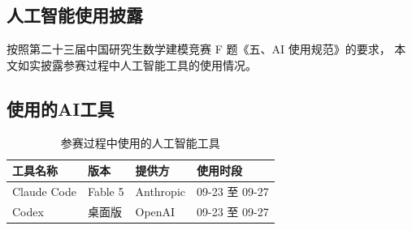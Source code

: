 \documentclass[bwprint]{gmcmthesis}
\numberwithin{equation}{section}
\numberwithin{figure}{section}
\numberwithin{table}{section}
\begin{document}
\clearpage
\begin{appendices}




%
%
\clearpage
\section{人工智能使用披露}

按照第二十三届中国研究生数学建模竞赛 F 题《五、AI 使用规范》的要求，
本文如实披露参赛过程中人工智能工具的使用情况。

\subsection{使用的AI工具}

\begin{table}[htp!]
\centering
\renewcommand\arraystretch{1.3}
\begin{tabular*}{\textwidth}{@{\extracolsep{\fill}}llll@{}}
  \toprule
  工具名称 & 版本 & 提供方 & 使用时段 \\
  \midrule
  Claude Code & Fable 5 & Anthropic & 09-23 至 09-27 \\
  Codex & 桌面版 & OpenAI & 09-23 至 09-27 \\
  \bottomrule
\end{tabular*}
\caption{参赛过程中使用的人工智能工具}
\label{tab:ai-tools}
\end{table}


\end{appendices}
\end{document}
